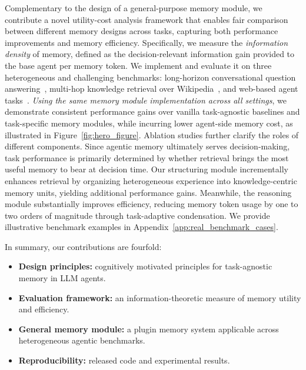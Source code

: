 Complementary to the design of a general-purpose memory module, we contribute a novel utility-cost analysis framework that enables fair comparison between different memory designs across tasks, capturing both performance improvements and memory efficiency. Specifically, we measure the \textit{information density} of memory, defined as the decision-relevant information gain provided to the base agent per memory token. We implement \plugmem and evaluate it on three heterogeneous and challenging benchmarks: long-horizon conversational question answering~\citep{wu2024longmemeval}, multi-hop knowledge retrieval over Wikipedia~\citep{yang2018hotpotqadatasetdiverseexplainable}, and web-based agent tasks~\citep{zhou2024webarenarealisticwebenvironment}. \textit{Using the same memory module implementation across all settings}, we demonstrate consistent performance gains over vanilla task-agnostic baselines and task-specific memory modules, while incurring lower agent-side memory cost, as illustrated in Figure~\ref{fig:hero_figure}.
Ablation studies further clarify the roles of different components. Since agentic memory ultimately serves decision-making, task performance is primarily determined by whether retrieval brings the most useful memory to bear at decision time. Our structuring module incrementally enhances retrieval by organizing heterogeneous experience into knowledge-centric memory units, yielding additional performance gains. Meanwhile, the reasoning module substantially improves efficiency, reducing memory token usage by one to two orders of magnitude through task-adaptive condensation. We provide illustrative benchmark examples in Appendix~\ref{app:real_benchmark_cases}. 

In summary, our contributions are fourfold:

\begin{itemize}[leftmargin=*, noitemsep, topsep=0.5pt]

    \item \textbf{Design principles:} cognitively motivated principles for task-agnostic memory in LLM agents.
    \item \textbf{Evaluation framework:} an information-theoretic measure of memory utility and efficiency.
    \item \textbf{General memory module:} a plugin memory system applicable across heterogeneous agentic benchmarks. 
    \item \textbf{Reproducibility:} released code and experimental results.
\end{itemize}
